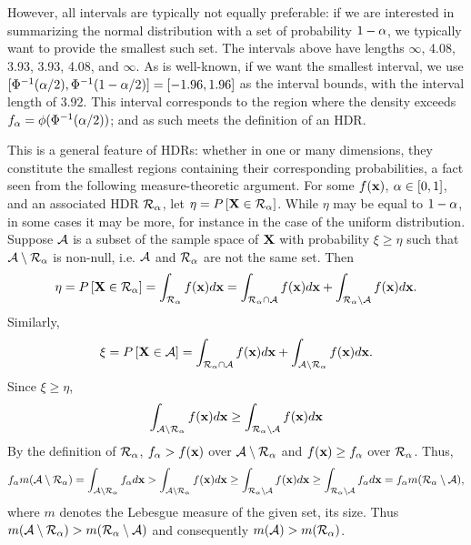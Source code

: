 However, all intervals are typically not equally preferable: if we are interested in summarizing the normal distribution with a set of probability $1 - \alpha$, we typically want to provide the smallest such set.
The intervals above have lengths $\infty$, 4.08, 3.93, 3.93, 4.08, and $\infty$.
As is well-known, if we want the smallest interval, we use $[\Phi^{-1}(\alpha/2), \Phi^{-1}(1-\alpha/2)] = [-1.96, 1.96]$ as the interval bounds, with the interval length of 3.92.
This interval corresponds to the region where the density exceeds $f_{\alpha} = \phi(\Phi^{-1}(\alpha/2))$;
and as such meets the definition of an HDR.

This is a general feature of HDRs: whether in one or many dimensions, they constitute the smallest regions containing their corresponding probabilities, a fact seen from the following measure-theoretic argument. For some $f(\textbf{x})$, $\alpha \in [0, 1]$, and an associated HDR $\mathcal{R}_{\alpha}$, let $\eta = P\left[\textbf{X} \in \mathcal{R}_{\alpha}\right]$. While $\eta$ may be equal to $1 - \alpha$, in some cases it may be more, for instance in the case of the uniform distribution. %
Suppose $\mathcal{A}$ is a subset of the sample space of $\textbf{X}$ with probability $\xi \geq \eta$ such that $\mathcal{A} \setminus \mathcal{R}_{\alpha}$ is non-null, i.e.  $\mathcal{A}$ and $\mathcal{R}_{\alpha}$ are not the same set. Then
$$
\eta = P\left[\textbf{X} \in \mathcal{R}_{\alpha}\right]
= \int_{\mathcal{R}_{\alpha}}f(\textbf{x})d\textbf{x}
= \int_{\mathcal{R}_{\alpha} \cap \mathcal{A}}f(\textbf{x})d\textbf{x} + \int_{\mathcal{R}_{\alpha} \setminus \mathcal{A}}f(\textbf{x})d\textbf{x}.
$$
Similarly,
$$
\xi = P\left[\textbf{X} \in \mathcal{A}\right]
= \int_{\mathcal{R}_{\alpha} \cap \mathcal{A}}f(\textbf{x})d\textbf{x} + \int_{\mathcal{A} \setminus \mathcal{R}_{\alpha}}f(\textbf{x})d\textbf{x}.
$$
Since $\xi \geq \eta$,
$$
\int_{\mathcal{A} \setminus \mathcal{R}_{\alpha}}f(\textbf{x})d\textbf{x}
\geq
\int_{\mathcal{R}_{\alpha} \setminus \mathcal{A}}f(\textbf{x})d\textbf{x}
$$
By the definition of $\mathcal{R}_{\alpha}$, $f_{\alpha} > f(\textbf{x})$ over $\mathcal{A} \setminus \mathcal{R}_{\alpha}$ and $f(\textbf{x}) \geq f_{\alpha}$ over $\mathcal{R}_{\alpha}$.
Thus,
$$
  f_{\alpha} m(\mathcal{A} \setminus \mathcal{R}_{\alpha})
  = \int_{\mathcal{A} \setminus \mathcal{R}_{\alpha}}f_{\alpha}d\textbf{x}
  > \int_{\mathcal{A} \setminus \mathcal{R}_{\alpha}}f(\textbf{x})d\textbf{x}
  \geq \int_{\mathcal{R}_{\alpha} \setminus \mathcal{A}}f(\textbf{x})d\textbf{x}
  \geq \int_{\mathcal{R}_{\alpha} \setminus \mathcal{A}}f_{\alpha}d\textbf{x}
  = f_{\alpha} m(\mathcal{R}_{\alpha} \setminus \mathcal{A}),
$$
where $m$ denotes the Lebesgue measure of the given set, its size. Thus $m(\mathcal{A}\setminus \mathcal{R}_{\alpha}) > m(\mathcal{R}_{\alpha} \setminus \mathcal{A})$ and consequently $m(\mathcal{A}) > m(\mathcal{R}_{\alpha})$.

